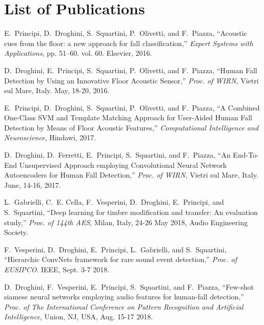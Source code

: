 \chapter*{List of Publications}
\pagestyle{plain}

\begin{list}{[]~}{}

\item
E.~Principi, D.~Droghini, S.~Squartini, P.~Olivetti, and F.~Piazza, ``Acoustic cues from the floor: a new approach for fall classification,'' \emph{Expert Systems with Applications}, pp. 51--60. vol. 60. Elsevier, 2016.

\item
 D.~Droghini, E.~Principi, S.~Squartini, P.~Olivetti, and F.~Piazza, ``Human Fall Detection by Using an Innovative Floor Acoustic Sensor,'' \emph{Proc. of WIRN}, Vietri sul Mare, Italy. May, 18-20, 2016.

\item
E.~Principi, D.~Droghini, S.~Squartini, P.~Olivetti, and F.~Piazza, ``A Combined One-Class SVM and Template Matching Approach for User-Aided Human Fall Detection by Means of Floor Acoustic Features,'' \emph{Computational Intelligence and Neuroscience}, Hindawi, 2017.

\item
D.~Droghini,  D.~Ferretti, E.~Principi, S.~Squartini, and F.~Piazza, ``An End-To-End Unsupervised Approach employing Convolutional Neural Network Autoencoders for Human Fall Detection,'' \emph{Proc. of WIRN}, Vietri sul Mare, Italy. June, 14-16, 2017.

\item
L.~Gabrielli, C.~E. Cella, F.~Vesperini, D.~Droghini, E.~Principi, and S.~Squartini, ``Deep learning for timbre modification and transfer: An evaluation study,'' \emph{Proc. of 144th AES}, Milan, Italy, 24-26 May 2018, Audio Engineering Society.

\item
F.~Vesperini, D.~Droghini, E.~Principi, L.~Gabrielli, and S.~Squartini, ``Hierarchic {C}onv{N}ets framework for rare sound event detection,'' \emph{Proc. of EUSIPCO}. IEEE, Sept. 3-7 2018.

\item
D.~Droghini, F.~Vesperini, E.~Principi, S.~Squartini, and F.~Piazza, ``Few-shot siamese neural networks employing audio features for human-fall detection,'' \emph{Proc. of The International Conference on Pattern Recognition and Artificial Intelligence}, Union, NJ, USA, Aug. 15-17 2018.


\end{list}
